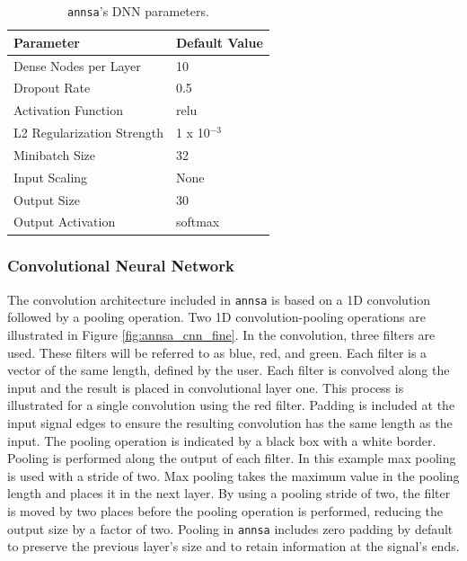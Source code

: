 \begin{table}[H]
\centering
\caption{\texttt{annsa}'s DNN parameters.}
\begin{tabular}{ll}
\hline
\textbf{Parameter} & \textbf{Default Value}\\ \hline
Dense Nodes per Layer & 10\\
Dropout Rate & 0.5\\
Activation Function & relu\\
L2 Regularization Strength & 1 x 10$^{-3}$\\ 
Minibatch Size & 32\\ 
Input Scaling & None\\
Output Size & 30\\
Output Activation & softmax\\ \hline
\end{tabular}
\label{table:annsa_dnn_params}
\end{table}

\subsubsection{Convolutional Neural Network} \label{annsa_section_conv_neural_network}

The convolution architecture included in \verb|annsa| is based on a 1D convolution followed by a pooling operation. Two 1D convolution-pooling operations are illustrated in Figure \ref{fig:annsa_cnn_fine}. In the convolution, three filters are used. These filters will be referred to as blue, red, and green. Each filter is a vector of the same length, defined by the user. Each filter is convolved along the input and the result is placed in convolutional layer one. This process is illustrated for a single convolution using the red filter. Padding is included at the input signal edges to ensure the resulting convolution has the same length as the input. The pooling operation is indicated by a black box with a white border. Pooling is performed along the output of each filter. In this example max pooling is used with a stride of two. Max pooling takes the maximum value in the pooling length and places it in the next layer. By using a pooling stride of two, the filter is moved by two places before the pooling operation is performed, reducing the output size by a factor of two. Pooling in \verb|annsa| includes zero padding by default to preserve the previous layer's size and to retain information at the signal's ends.

